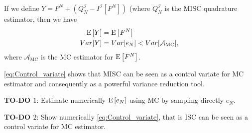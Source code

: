 If we define $Y=F^N+(Q_N^{\mathcal{I}}-I^{\mathcal{I}}[F^N])$ (where $Q_N^{\mathcal{I}}$ is the MISC quadrature estimator, then we have
\begin{align}\label{eq:Control_variate}
\mathrm{E}\left[Y\right]&=\mathrm{E}\left[F^N\right]\nonumber\\
Var[Y]&=Var[e_N]< Var[\mathcal{A}_{\text{MC}}],
\end{align}
where $\mathcal{A}_{\text{MC}}$ is the MC estimator for $\mathrm{E}\left[F^N\right]$.

\eqref{eq:Control_variate} shows that MISC can be seen as a control variate for MC estimator and consequently as a powerful variance reduction tool.


\textbf{TO-DO $1$}: Estimate numerically  $\mathrm{E}\left[e_N\right]$ using MC by sampling directly $e_N$.

\textbf{TO-DO $2$}: Show numerically \eqref{eq:Control_variate}, that is ISC can be seen as a control variate for MC estimator. 

